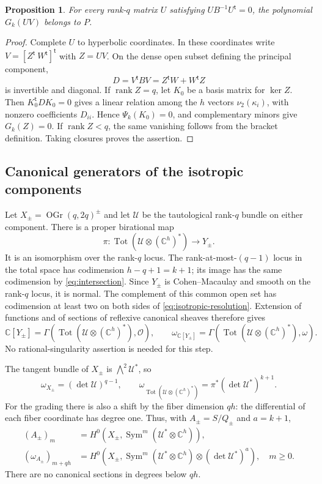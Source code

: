 \documentclass[11pt]{article}
\newtheorem{proposition}[theorem]{Proposition}
\theoremstyle{definition}
\theoremstyle{remark}
\numberwithin{equation}{section}
\DeclareMathOperator{\rank}{rank}
\DeclareMathOperator{\Sym}{Sym}
\DeclareMathOperator{\OGr}{OGr}
\DeclareMathOperator{\Tot}{Tot}
\newcommand{\CC}{\mathbb C}
\newcommand{\OO}{\mathcal O}
\newcommand{\UU}{\mathcal U}
\begin{document}
\begin{proposition}\label{prop:equations}
For every rank-$q$ matrix $U$ satisfying $UB^{-1}U^{\mathsf t}=0$,
the polynomial $G_k(UV)$ belongs to $P$.
\end{proposition}

\begin{proof}
Complete $U$ to hyperbolic coordinates. In these coordinates write
$V=[Z^{\mathsf t}\ W^{\mathsf t}]^{\mathsf t}$ with $Z=UV$.
On the dense open subset defining the principal component,
\[
 D=V^{\mathsf t}BV=Z^{\mathsf t}W+W^{\mathsf t}Z
\]
is invertible and diagonal. If $\rank Z=q$, let $K_0$ be a basis
matrix for $\ker Z$. Then $K_0^{\mathsf t}DK_0=0$ gives a linear
relation among the $h$ vectors $\nu_2(\kappa_i)$, with nonzero
coefficients $D_{ii}$. Hence $\Psi_k(K_0)=0$, and complementary
minors give $G_k(Z)=0$. If $\rank Z<q$, the same vanishing follows
from the bracket definition. Taking closures proves the assertion.
\end{proof}

\subsection{Canonical generators of the isotropic components}

Let $X_\pm=\OGr(q,2q)^\pm$ and let $\UU$ be the tautological
rank-$q$ bundle on either component. There is a proper birational map
\begin{equation}\label{eq:isotropic-resolution}
 \pi:\Tot(\UU\otimes(\CC^h)^*)\longrightarrow Y_\pm.
\end{equation}
It is an isomorphism over the rank-$q$ locus. The rank-at-most-$(q-1)$
locus in the total space has codimension $h-q+1=k+1$; its image has
the same codimension by \eqref{eq:intersection}. Since $Y_\pm$ is
Cohen--Macaulay and smooth on the rank-$q$ locus, it is normal.
The complement of this common open set has codimension at least two
on both sides of \eqref{eq:isotropic-resolution}. Extension of
functions and of sections of reflexive canonical sheaves therefore gives
\begin{equation}\label{eq:Hartogs}
 \CC[Y_\pm]=\Gamma(\Tot(\UU\otimes(\CC^h)^*),\OO),\qquad
 \omega_{\CC[Y_\pm]}=
 \Gamma(\Tot(\UU\otimes(\CC^h)^*),\omega).
\end{equation}
No rational-singularity assertion is needed for this step.

The tangent bundle of $X_\pm$ is $\bigwedge^2\UU^*$, so
\begin{equation}\label{eq:canonical-total}
 \omega_{X_\pm}=(\det\UU)^{q-1},\qquad
 \omega_{\Tot(\UU\otimes(\CC^h)^*)}
 =\pi^*(\det\UU^*)^{k+1}.
\end{equation}
For the grading there is also a shift by the fiber dimension $qh$:
the differential of each fiber coordinate has degree one. Thus, with
$A_\pm=S/Q_\pm$ and $a=k+1$,
\begin{align}
 (A_\pm)_m&=H^0(X_\pm,\Sym^m(\UU^*\otimes\CC^h)),\label{eq:sections-ring}\\
 (\omega_{A_\pm})_{m+qh}
 &=H^0(X_\pm,\Sym^m(\UU^*\otimes\CC^h)\otimes(\det\UU^*)^a),
 \quad m\geq0.\label{eq:sections-canonical}
\end{align}
There are no canonical sections in degrees below $qh$.
\end{document}
